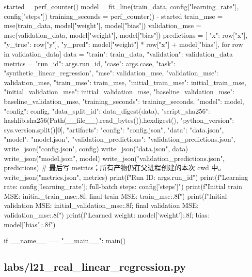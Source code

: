 \begin{Code}
    started = perf_counter()
    model = fit_line(train_data, config["learning_rate"], config["steps"])
    training_seconds = perf_counter() - started
    train_mse = mse(train_data, model["weight"], model["bias"])
    validation_mse = mse(validation_data, model["weight"], model["bias"])
    predictions = [{
        "x": row["x"], "y_true": row["y"],
        "y_pred": model["weight"] * row["x"] + model["bias"],
    } for row in validation_data]
    data = {"train": train_data, "validation": validation_data}
    metrics = {
        "run_id": args.run_id, "case": args.case, "task": "synthetic_linear_regression",
        "mse": validation_mse, "validation_mse": validation_mse, "train_mse": train_mse,
        "initial_train_mse": initial_train_mse, "initial_validation_mse": initial_validation_mse,
        "baseline_validation_mse": baseline_validation_mse,
        "training_seconds": training_seconds, "model": model, "config": config,
        "data_split_id": data_digest(data),
        "script_sha256": hashlib.sha256(Path(__file__).read_bytes()).hexdigest(),
        "python_version": sys.version.split()[0],
        "artifacts": {"config": "config.json", "data": "data.json", "model": "model.json",
                      "validation_predictions": "validation_predictions.json"},
    }
    write_json("config.json", config)
    write_json("data.json", data)
    write_json("model.json", model)
    write_json("validation_predictions.json", predictions)
    # 最后写 metrics；所有产物仍在父进程创建的本次 cwd 中。
    write_json("metrics.json", metrics)
    print(f"Run ID: {args.run_id}")
    print(f"Learning rate: {config['learning_rate']}; full-batch steps: {config['steps']}")
    print(f"Initial train MSE: {initial_train_mse:.8f}; final train MSE: {train_mse:.8f}")
    print(f"Initial validation MSE: {initial_validation_mse:.8f}; final validation MSE: {validation_mse:.8f}")
    print(f"Learned weight: {model['weight']:.8f}; bias: {model['bias']:.8f}")


if __name__ == "__main__":
    main()
\end{Code}

\subsection{labs/l21\_real\_linear\_regression.py}

